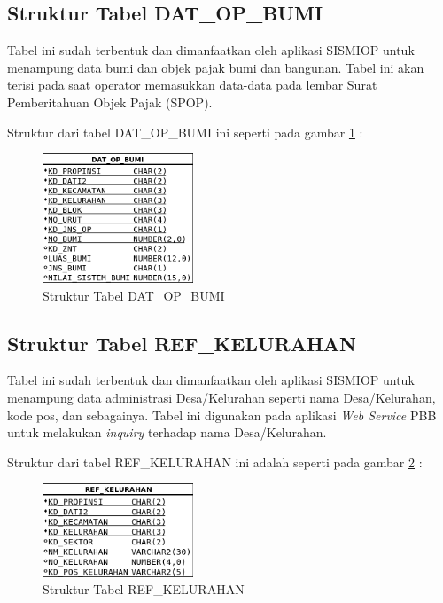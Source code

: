 \documentclass[pdftex,12pt, oneside]{article}
\begin{document}
\subsection{Struktur Tabel DAT\_OP\_BUMI}

Tabel ini sudah terbentuk dan dimanfaatkan oleh aplikasi SISMIOP untuk menampung data bumi dan objek pajak bumi dan bangunan. Tabel ini akan terisi pada saat operator memasukkan data-data pada lembar Surat Pemberitahuan Objek Pajak (SPOP). 

Struktur dari tabel DAT\_OP\_BUMI ini seperti pada gambar \ref{fig:tabel-dat-op-bumi} : 

\begin{figure}[H]
	\centering
	\includegraphics[width=0.4\textwidth]{./resources/03-struktur-tabel-dat-op-bumi}
	\caption{Struktur Tabel DAT\_OP\_BUMI}
	\label{fig:tabel-dat-op-bumi}
\end{figure}

\subsection{Struktur Tabel REF\_KELURAHAN}

Tabel ini sudah terbentuk dan dimanfaatkan oleh aplikasi SISMIOP untuk menampung data administrasi Desa/Kelurahan seperti nama Desa/Kelurahan, kode pos, dan sebagainya. Tabel ini digunakan pada aplikasi \textit{Web Service} PBB untuk melakukan \textit{inquiry} terhadap nama Desa/Kelurahan.

Struktur dari tabel REF\_KELURAHAN ini adalah seperti pada gambar \ref{fig:tabel-ref-kelurahan} :

\begin{figure}[H]
  \centering
  \includegraphics[width=0.4\textwidth]{./resources/04-struktur-tabel-ref-kelurahan}
  \caption{Struktur Tabel REF\_KELURAHAN}
  \label{fig:tabel-ref-kelurahan}
\end{figure}
\end{document}
